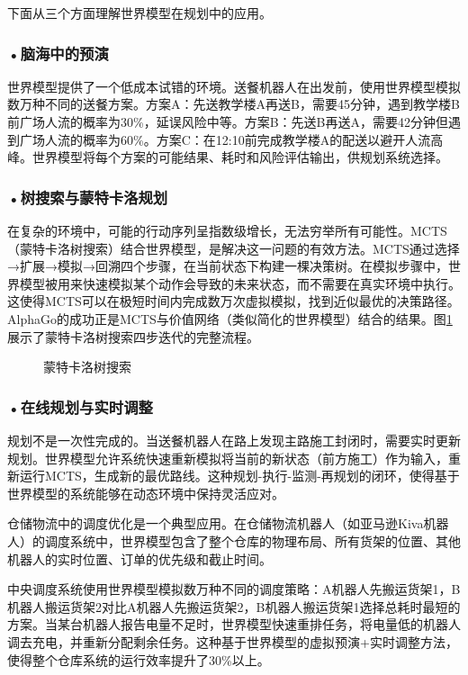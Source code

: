 下面从三个方面理解世界模型在规划中的应用。

\subsubsection*{\textbf{•脑海中的预演}}

世界模型提供了一个低成本试错的环境。送餐机器人在出发前，使用世界模型模拟数万种不同的送餐方案。方案A：先送教学楼A再送B，需要45分钟，遇到教学楼B前广场人流的概率为30\%，延误风险中等。方案B：先送B再送A，需要42分钟但遇到广场人流的概率为60\%。方案C：在12:10前完成教学楼A的配送以避开人流高峰。世界模型将每个方案的可能结果、耗时和风险评估输出，供规划系统选择。

\subsubsection*{\textbf{•树搜索与蒙特卡洛规划}}

在复杂的环境中，可能的行动序列呈指数级增长，无法穷举所有可能性。MCTS（蒙特卡洛树搜索）结合世界模型，是解决这一问题的有效方法。MCTS通过选择→扩展→模拟→回溯四个步骤，在当前状态下构建一棵决策树。在模拟步骤中，世界模型被用来快速模拟某个动作会导致的未来状态，而不需要在真实环境中执行。这使得MCTS可以在极短时间内完成数万次虚拟模拟，找到近似最优的决策路径。AlphaGo的成功正是MCTS与价值网络（类似简化的世界模型）结合的结果。图\ref{fig:ch2_2_37}展示了蒙特卡洛树搜索四步迭代的完整流程。

\begin{figure}[H]
\centering
{}
\caption{蒙特卡洛树搜索}
\label{fig:ch2_2_37}
\end{figure}

\subsubsection*{\textbf{•在线规划与实时调整}}

规划不是一次性完成的。当送餐机器人在路上发现主路施工封闭时，需要实时更新规划。世界模型允许系统快速重新模拟将当前的新状态（前方施工）作为输入，重新运行MCTS，生成新的最优路线。这种规划-执行-监测-再规划的闭环，使得基于世界模型的系统能够在动态环境中保持灵活应对。

仓储物流中的调度优化是一个典型应用。在仓储物流机器人（如亚马逊Kiva机器人）的调度系统中，世界模型包含了整个仓库的物理布局、所有货架的位置、其他机器人的实时位置、订单的优先级和截止时间。

中央调度系统使用世界模型模拟数万种不同的调度策略：A机器人先搬运货架1，B机器人搬运货架2对比A机器人先搬运货架2，B机器人搬运货架1选择总耗时最短的方案。当某台机器人报告电量不足时，世界模型快速重排任务，将电量低的机器人调去充电，并重新分配剩余任务。这种基于世界模型的虚拟预演+实时调整方法，使得整个仓库系统的运行效率提升了30\%以上。

